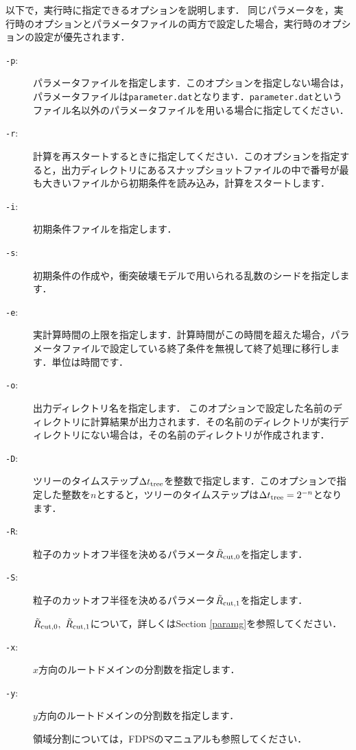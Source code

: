 \documentclass[12pt,a4paper,dvipdfmx]{jsarticle}
\begin{document}
以下で，実行時に指定できるオプションを説明します．
同じパラメータを，実行時のオプションとパラメータファイルの両方で設定した場合，実行時のオプションの設定が優先されます．

\begin{description}
\item[\texttt{-p}:]
パラメータファイルを指定します．このオプションを指定しない場合は，パラメータファイルは\texttt{parameter.dat}となります．\texttt{parameter.dat}というファイル名以外のパラメータファイルを用いる場合に指定してください．
\item[\texttt{-r}:]
計算を再スタートするときに指定してください．このオプションを指定すると，出力ディレクトリにあるスナップショットファイルの中で番号が最も大きいファイルから初期条件を読み込み，計算をスタートします．
\item[\texttt{-i}:]
初期条件ファイルを指定します．
\item[\texttt{-s}:]
初期条件の作成や，衝突破壊モデルで用いられる乱数のシードを指定します．
\item[\texttt{-e}:]
実計算時間の上限を指定します．計算時間がこの時間を超えた場合，パラメータファイルで設定している終了条件を無視して終了処理に移行します．単位は時間です．
\item[\texttt{-o}:]
出力ディレクトリ名を指定します．
このオプションで設定した名前のディレクトリに計算結果が出力されます．その名前のディレクトリが実行ディレクトリにない場合は，その名前のディレクトリが作成されます．
\item[\texttt{-D}:]
ツリーのタイムステップ$\Delta t_{\rm tree}$を整数で指定します．このオプションで指定した整数を$n$とすると，ツリーのタイムステップは$\Delta t_{\rm tree}=2^{-n}$となります．
\item[\texttt{-R}:]
粒子のカットオフ半径を決めるパラメータ$\tilde{R}_{\rm cut,0}$を指定します．
\item[\texttt{-S}:]
粒子のカットオフ半径を決めるパラメータ$\tilde{R}_{\rm cut,1}$を指定します．

$\tilde{R}_{\rm cut,0},\ \tilde{R}_{\rm cut,1}$について，詳しくはSection \ref{paramg}を参照してください．
\item[\texttt{-x}:]
$x$方向のルートドメインの分割数を指定します．
\item[\texttt{-y}:]
$y$方向のルートドメインの分割数を指定します．

領域分割については，FDPSのマニュアルも参照してください．


\end{description}
\end{document}
